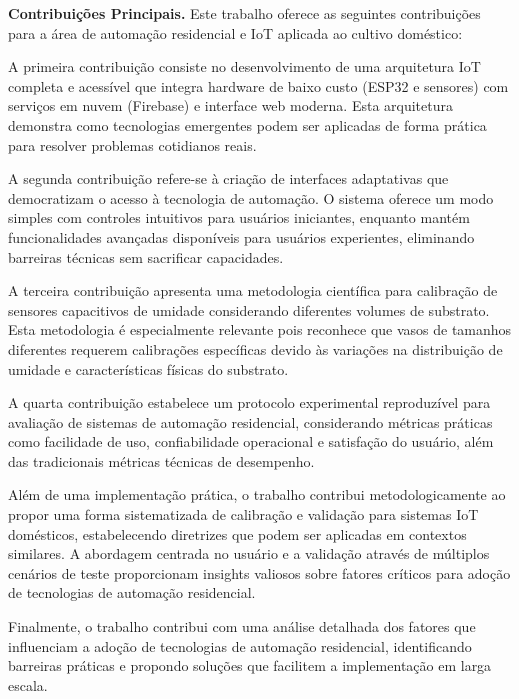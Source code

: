 \documentclass[twoside,english,brazilian]{UNISINOSmonografia}
\begin{document}
\noindent\textbf{Contribuições Principais.} Este trabalho oferece as seguintes contribuições para a área de automação residencial e IoT aplicada ao cultivo doméstico:

A primeira contribuição consiste no desenvolvimento de uma arquitetura IoT completa e acessível que integra hardware de baixo custo (ESP32 e sensores) com serviços em nuvem (Firebase) e interface web moderna. Esta arquitetura demonstra como tecnologias emergentes podem ser aplicadas de forma prática para resolver problemas cotidianos reais.

A segunda contribuição refere-se à criação de interfaces adaptativas que democratizam o acesso à tecnologia de automação. O sistema oferece um modo simples com controles intuitivos para usuários iniciantes, enquanto mantém funcionalidades avançadas disponíveis para usuários experientes, eliminando barreiras técnicas sem sacrificar capacidades.

A terceira contribuição apresenta uma metodologia científica para calibração de sensores capacitivos de umidade considerando diferentes volumes de substrato. Esta metodologia é especialmente relevante pois reconhece que vasos de tamanhos diferentes requerem calibrações específicas devido às variações na distribuição de umidade e características físicas do substrato.

A quarta contribuição estabelece um protocolo experimental reproduzível para avaliação de sistemas de automação residencial, considerando métricas práticas como facilidade de uso, confiabilidade operacional e satisfação do usuário, além das tradicionais métricas técnicas de desempenho.

Além de uma implementação prática, o trabalho contribui metodologicamente ao propor uma forma sistematizada de calibração e validação para sistemas IoT domésticos, estabelecendo diretrizes que podem ser aplicadas em contextos similares. A abordagem centrada no usuário e a validação através de múltiplos cenários de teste proporcionam insights valiosos sobre fatores críticos para adoção de tecnologias de automação residencial.

Finalmente, o trabalho contribui com uma análise detalhada dos fatores que influenciam a adoção de tecnologias de automação residencial, identificando barreiras práticas e propondo soluções que facilitem a implementação em larga escala.
\end{document}
